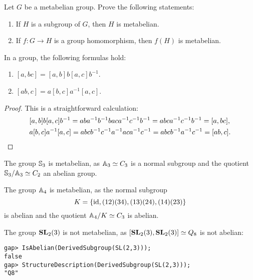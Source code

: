 \begin{exercise}
\label{xca:metabelian2}
Let $G$ be a metabelian group. Prove the following statements: 
\begin{enumerate}
\item If $H$ is a subgroup of $G$, then $H$ is metabelian.
\item If $f\colon G\to H$ is a group homomorphism, then $f(H)$ is metabelian. 
\end{enumerate}
\end{exercise}

\begin{lemma}
In a group, the following formulas hold:
\begin{enumerate}
	\item $[a,bc]=[a,b]b[a,c]b^{-1}$. 
	\item $[ab,c]=a[b,c]a^{-1}[a,c]$.
\end{enumerate}
\end{lemma}

\begin{proof}
This is a straightforward calculation:
\begin{align*}
&[a,b]b[a,c]b^{-1}=aba^{-1}b^{-1}baca^{-1}c^{-1}b^{-1}=abca^{-1}c^{-1}b^{-1}=[a,bc],\\
&a[b,c]a^{-1}[a,c]=abcb^{-1}c^{-1}a^{-1}aca^{-1}c^{-1}=abcb^{-1}a^{-1}c^{-1}=[ab,c].\qedhere
\end{align*}
\end{proof}

\begin{example}
The group $\mathbb{S}_3$ is metabelian, as $\mathbb{A}_3\simeq C_3$ is a normal subgroup 
and the quotient $\mathbb{S}_3/\mathbb{A}_3\simeq C_2$ an abelian group. 
\end{example}

\begin{example}
The group $\mathbb{A}_4$ is metabelian, as the normal subgroup
\[
K=\{\operatorname{id},(12)(34),(13)(24),(14)(23)\}
\]
is abelian and the quotient 
$\mathbb{A}_4/K\simeq C_3$ is abelian.
\end{example}

\begin{example}
The group $\mathbf{SL}_2(3)$ is not metabelian, as $[\mathbf{SL}_2(3),\mathbf{SL}_2(3)]\simeq Q_8$ 
is not abelian: 
\begin{lstlisting}
gap> IsAbelian(DerivedSubgroup(SL(2,3)));
false
gap> StructureDescription(DerivedSubgroup(SL(2,3)));
"Q8"
\end{lstlisting}
\end{example}

